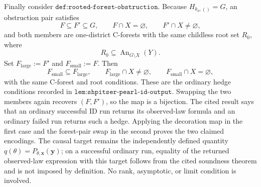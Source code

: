 Finally consider \(\texttt{def:rooted-forest-obstruction}\).  Because \(H_{k_0,()}=G\), an obstruction pair satisfies
\[
  F\subseteq F'\subseteq G,
  \qquad F\cap X=\varnothing,
  \qquad F'\cap X\neq\varnothing,
\]
and both members are one-district C-forests with the same childless root set \(R_0\), where
\[
  R_0\subseteq\operatorname{An}_{G\setminus X}(Y).
\]
Set \(F_{\mathrm{large}}:=F'\) and \(F_{\mathrm{small}}:=F\).  Then
\[
  F_{\mathrm{small}}\subseteq F_{\mathrm{large}},
  \qquad
  F_{\mathrm{large}}\cap X\neq\varnothing,
  \qquad
  F_{\mathrm{small}}\cap X=\varnothing,
\]
with the same C-forest and root conditions.  These are the ordinary hedge conditions recorded in \(\texttt{lem:shpitser-pearl-id-output}\).  Swapping the two members again recovers \((F,F')\), so the map is a bijection.  The cited result says that an ordinary successful \(\mathrm{ID}\) run returns its observed-law formula and an ordinary failed run returns such a hedge.  Applying the decoration map in the first case and the forest-pair swap in the second proves the two claimed encodings.  The causal target remains the independently defined quantity \(q(\theta)=P_{\theta,\mathbf x}(\mathbf y)\); on a successful ordinary run, equality of the returned observed-law expression with this target follows from the cited soundness theorem and is not imposed by definition.  No rank, asymptotic, or limit condition is involved.
